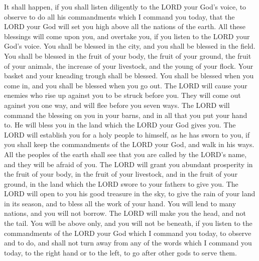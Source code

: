  It shall happen, if you shall listen diligently to the LORD
your God's voice, to observe to do all his commandments which I command
you today, that the LORD your God will set you high above all the
nations of the earth.  All these blessings will come upon
you, and overtake you, if you listen to the LORD your God's voice.
 You shall be blessed in the city, and you shall be blessed
in the field.  You shall be blessed in the fruit of your
body, the fruit of your ground, the fruit of your animals, the increase
of your livestock, and the young of your flock.  Your basket
and your kneading trough shall be blessed.  You shall be
blessed when you come in, and you shall be blessed when you go out.
 The LORD will cause your enemies who rise up against you to
be struck before you. They will come out against you one way, and will
flee before you seven ways.  The LORD will command the
blessing on you in your barns, and in all that you put your hand to. He
will bless you in the land which the LORD your God gives you.
 The LORD will establish you for a holy people to himself,
as he has sworn to you, if you shall keep the commandments of the LORD
your God, and walk in his ways.  All the peoples of the
earth shall see that you are called by the LORD's name, and they will be
afraid of you.  The LORD will grant you abundant prosperity
in the fruit of your body, in the fruit of your livestock, and in the
fruit of your ground, in the land which the LORD swore to your fathers
to give you.  The LORD will open to you his good treasure
in the sky, to give the rain of your land in its season, and to bless
all the work of your hand. You will lend to many nations, and you will
not borrow.  The LORD will make you the head, and not the
tail. You will be above only, and you will not be beneath, if you listen
to the commandments of the LORD your God which I command you today, to
observe and to do,  and shall not turn away from any of the
words which I command you today, to the right hand or to the left, to go
after other gods to serve them.

